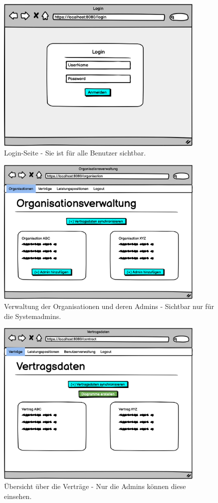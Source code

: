 
\begin{figure}[h]
\centering
\includegraphics[width=10cm]{img/mockup_web/login.png}
\caption{Login-Seite - Sie ist für alle Benutzer sichtbar.}
\end{figure}

\begin{figure}[h]
\centering
\includegraphics[width=10cm]{img/mockup_web/system-admin-orgs.png}
\caption{Verwaltung der Organisationen und deren Admins - Sichtbar nur für die Systemadmins.}
\end{figure}

\begin{figure}[h]
\centering
\includegraphics[width=10cm]{img/mockup_web/admin-vertraege.png}
\caption{Übersicht über die Verträge - Nur die Admins können diese einsehen.}
\end{figure}

